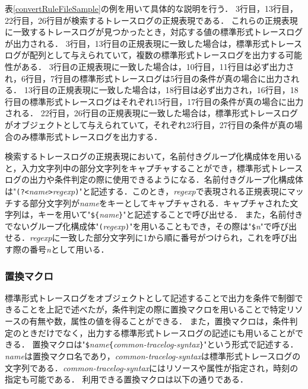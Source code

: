 表\ref{convertRuleFileSample}の例を用いて具体的な説明を行う．
3行目，13行目，22行目，26行目が検索するトレースログの正規表現である．
これらの正規表現に一致するトレースログが見つかったとき，対応する値の標準形式トレースログが出力される．
3行目，13行目の正規表現に一致した場合は，標準形式トレースログが配列として与えられていて，複数の標準形式トレースログを出力する可能性がある．
3行目の正規表現に一致した場合は，10行目，11行目は必ず出力され，6行目，7行目の標準形式トレースログは5行目の条件が真の場合に出力される．
13行目の正規表現に一致した場合は，18行目は必ず出力され，16行目，18行目の標準形式トレースログはそれぞれ15行目，17行目の条件が真の場合に出力される．
22行目，26行目の正規表現に一致した場合は，標準形式トレースログがオブジェクトとして与えられていて，それぞれ23行目，27行目の条件が真の場合のみ標準形式トレースログを出力する．

検索するトレースログの正規表現において，名前付きグループ化構成体を用いると，入力文字列中の部分文字列をキャプチャすることができ，標準形式トレースログの出力や条件判定の際に使用できるようになる．名前付きグループ化構成体は"\texttt{(?<}\textit{name}\texttt{>}\textit{regexp}\texttt{)}"と記述する．このとき，\textit{regexp}で表現される正規表現にマッチする部分文字列が\textit{name}をキーとしてキャプチャされる．キャプチャされた文字列は，キーを用いて"\verb|${|\textit{name}\verb|}|"と記述することで呼び出せる．
また，名前付きでないグループ化構成体"\texttt{(}\textit{regexp}\texttt{)}"を用いることもでき，その際は"\texttt{\$}\textit{n}"で呼び出せる．\textit{regexp}に一致した部分文字列に1から順に番号がつけられ，これを呼び出す際の番号\textit{n}として用いる．

\subsubsection{置換マクロ}

標準形式トレースログをオブジェクトとして記述することで出力を条件で制御できることを上記で述べたが，条件判定の際に置換マクロを用いることで特定リソースの有無や数，属性の値を得ることができる．
また，置換マクロは，条件判定のときだけでなく，出力する標準形式トレースログの記述にも用いることができる．
置換マクロは"\verb|$|{\it name}\verb|{|{\it common-tracelog-syntax}\verb|}|"という形式で記述する．{\it name}は置換マクロ名であり，{\it common-tracelog-syntax}は標準形式トレースログの文字列である．{\it common-tracelog-syntax}にはリソースや属性が指定され，時刻の指定も可能である．
利用できる置換マクロは以下の通りである．

